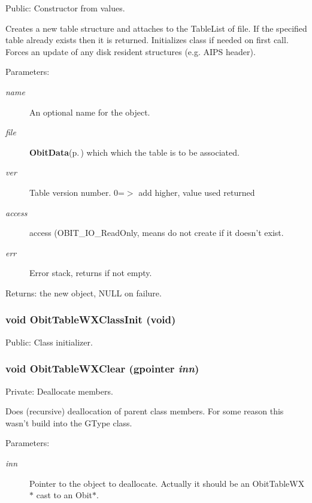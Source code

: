 Public: Constructor from values. 

Creates a new table structure and attaches to the Table\-List of file. If the specified table already exists then it is returned. Initializes class if needed on first call. Forces an update of any disk resident structures (e.g. AIPS header). \begin{Desc}
\item[Parameters:]
\begin{description}
\item[{\em name}]An optional name for the object. \item[{\em file}]{\bf Obit\-Data}{\rm (p.\,\pageref{structObitData})} which which the table is to be associated. \item[{\em ver}]Table version number. 0=$>$ add higher, value used returned \item[{\em access}]access (OBIT\_\-IO\_\-Read\-Only, means do not create if it doesn't exist. \item[{\em err}]Error stack, returns if not empty. \end{description}
\end{Desc}
\begin{Desc}
\item[Returns:]the new object, NULL on failure. \end{Desc}
\subsubsection{\setlength{\rightskip}{0pt plus 5cm}void Obit\-Table\-WXClass\-Init (void)}\label{ObitTableWX_8c_a27}


Public: Class initializer. 

\subsubsection{\setlength{\rightskip}{0pt plus 5cm}void Obit\-Table\-WXClear (gpointer {\em inn})}\label{ObitTableWX_8c_a9}


Private: Deallocate members. 

Does (recursive) deallocation of parent class members. For some reason this wasn't build into the GType class. \begin{Desc}
\item[Parameters:]
\begin{description}
\item[{\em inn}]Pointer to the object to deallocate. Actually it should be an Obit\-Table\-WX$\ast$ cast to an Obit$\ast$. \end{description}
\end{Desc}
